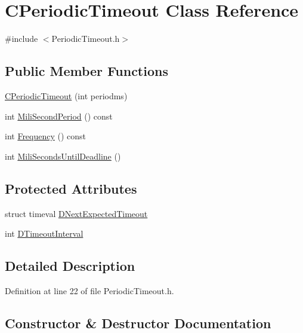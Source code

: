 \hypertarget{classCPeriodicTimeout}{}\section{C\+Periodic\+Timeout Class Reference}
\label{classCPeriodicTimeout}


{\ttfamily \#include $<$Periodic\+Timeout.\+h$>$}

\subsection*{Public Member Functions}
\begin{DoxyCompactItemize}
\item 
\hyperlink{classCPeriodicTimeout_a5f892d7a3782ae7663bd8a01736dd903}{C\+Periodic\+Timeout} (int periodms)
\item 
int \hyperlink{classCPeriodicTimeout_ad5e27bd939d6452b0667d0c5ef74247e}{Mili\+Second\+Period} () const
\item 
int \hyperlink{classCPeriodicTimeout_af5a198bf926337b0f4470d0b77bca542}{Frequency} () const
\item 
int \hyperlink{classCPeriodicTimeout_a5d32d0a29ba5efa718f3489cb9fb2340}{Mili\+Seconds\+Until\+Deadline} ()
\end{DoxyCompactItemize}
\subsection*{Protected Attributes}
\begin{DoxyCompactItemize}
\item 
struct timeval \hyperlink{classCPeriodicTimeout_ae85c3dd7526ee6b538b7c6478133013c}{D\+Next\+Expected\+Timeout}
\item 
int \hyperlink{classCPeriodicTimeout_ab0c2b821c02366c9638a66eced3c1f34}{D\+Timeout\+Interval}
\end{DoxyCompactItemize}


\subsection{Detailed Description}


Definition at line 22 of file Periodic\+Timeout.\+h.



\subsection{Constructor \& Destructor Documentation}
\hypertarget{classCPeriodicTimeout_a5f892d7a3782ae7663bd8a01736dd903}{}\label{classCPeriodicTimeout_a5f892d7a3782ae7663bd8a01736dd903} 
